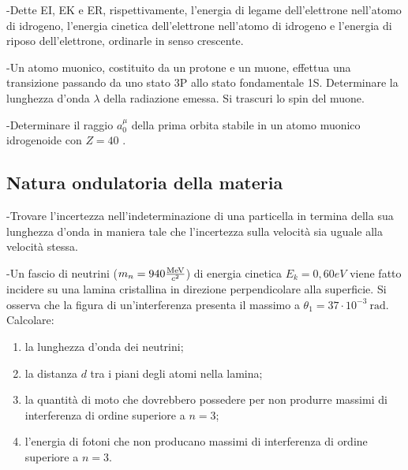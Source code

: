\documentclass[12pt,twoside,a4]{article}
\begin{document}
\begin{esercizio}
	-Dette EI, EK e ER, rispettivamente, l'energia di legame dell'elettrone nell'atomo di idrogeno, l'energia cinetica dell'elettrone nell'atomo di idrogeno e l'energia di riposo dell'elettrone, ordinarle in senso crescente.
\end{esercizio}

\begin{esercizio}
	-Un atomo muonico, costituito da un protone e un muone, effettua una transizione passando da uno stato 3P allo stato fondamentale 1S. Determinare la lunghezza d'onda $\lambda$ della radiazione emessa. Si trascuri lo spin del muone.
\end{esercizio}

\newpage
\begin{esercizio}
	-Determinare il raggio $a^\mu_0$ della prima orbita stabile in un atomo muonico idrogenoide con $Z = 40$  .
\end{esercizio}

\newpage
\subsection{Natura ondulatoria della materia}
\begin{esercizio}
	-Trovare l'incertezza nell'indeterminazione di una particella in termina della sua lunghezza d'onda in maniera tale che l'incertezza sulla velocità  sia uguale alla velocità  stessa.
\end{esercizio}

\begin{esercizio}
	-Un fascio di neutrini ($m_n =940 \frac{\mathrm{MeV}}{c^2}$) di energia cinetica $E_k=0,60 eV$ viene fatto incidere su una lamina cristallina in direzione perpendicolare alla superficie. Si osserva che la figura di un'interferenza presenta il massimo a $\theta_1=37 \cdot 10^{-3} \ \mathrm{rad}$. Calcolare:
	\begin{enumerate}[label=(\textit{\roman*})]
		\item la lunghezza d'onda dei neutrini;
		\item la distanza $d$ tra i piani degli atomi nella lamina;
		\item la quantità  di moto che dovrebbero possedere per non produrre massimi di interferenza di ordine superiore a $n=3$;
		\item l'energia di fotoni che non producano massimi di interferenza di ordine superiore a $n=3$.
	\end{enumerate}
\end{esercizio}
\end{document}

